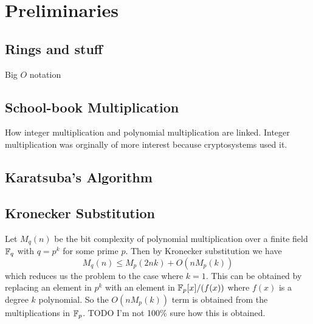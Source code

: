 \chapter{Preliminaries}\label{preliminaries}

\section{Rings and stuff}
\label{sec:prelim-rings}

Big $O$ notation 
\section{School-book Multiplication}
\label{sec:prelim-schoolbook}

How integer multiplication and polynomial multiplication are linked. Integer multiplication was orginally of more interest because cryptosystems used it.

\section{Karatsuba's Algorithm}
\label{sec:prelim-karatsuba}

\section{Kronecker Substitution}%
\label{sub:kronecker_substitution}

Let $M_q(n)$ be the bit complexity of polynomial multiplication over a finite field $\mathbb{F}_q$ with $q = p^k$ for some prime $p$. Then by Kronecker substitution we have
\[
    M_q(n) \leq M_p(2nk) + O(n M_p(k))
\]
which reduces us the problem to the case where $k = 1$. This can be obtained by replacing an element in $p^k$ with an element in $\mathbb{F}_p[x] / (f(x))$ where $f(x)$ is a degree $k$ polynomial. So the $O(n M_p(k))$ term is obtained from the multiplications in $\mathbb{F}_p$. TODO I'm not 100\% sure how this is obtained.

